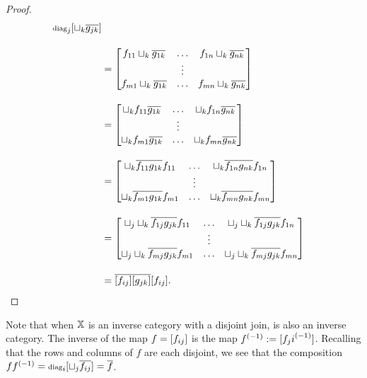 \begin{proof}
\begin{align*}
        [f_{i\jay}]\diag_\jay[\djoin_k \rst{g_{\jay k}}]
        \\[10pt]
      & = \begin{bmatrix}
        f_{11}\djoin_k \rst{g_{1 k}} &\ldots & f_{1n}\djoin_k \rst{g_{n k}} \\
        & \vdots & \\
        f_{m1}\djoin_k \rst{g_{1 k}} &\ldots & f_{m n}\djoin_k \rst{g_{n k}}
      \end{bmatrix}\\[10pt]
      & = \begin{bmatrix}
        \djoin_k f_{11}\rst{g_{1 k}} &\ldots & \djoin_k f_{1n}\rst{g_{n k}} \\
        & \vdots & \\
        \djoin_k f_{m1}\rst{g_{1 k}} &\ldots & \djoin_k f_{m n}\rst{g_{n k}}
      \end{bmatrix}\\[10pt]
      & = \begin{bmatrix}
        \djoin_k \rst{f_{11} g_{1 k}} f_{11} &\ldots & \djoin_k \rst{f_{1n} g_{n k}} f_{1n}\\
        & \vdots & \\
        \djoin_k \rst{f_{m1} g_{1 k}}f_{m1} &\ldots & \djoin_k \rst{f_{m n} g_{n k}}f_{m n}
      \end{bmatrix}\\[10pt]
      & = \begin{bmatrix} %
        \djoin_\jay\djoin_k \rst{f_{1\jay} g_{\jay k}} f_{11} &\ldots &
          \djoin_\jay\djoin_k \rst{f_{1\jay} g_{\jay k}} f_{1n}\\
        & \vdots & \\
        \djoin_\jay\djoin_k \rst{f_{m\jay} g_{\jay k}}f_{m1} &\ldots &
          \djoin_\jay\djoin_k \rst{f_{m \jay} g_{\jay k}}f_{m n}
      \end{bmatrix}\\[10pt]
      &= \rst{[f_{i\jay}][g_{\jay k}]} [f_{i\jay}].
  \end{align*}
\end{proof}

Note that when $\mathbb{X}$ is an inverse category with a disjoint join, \imatx is also an inverse
category. The inverse of the map $f = [f_{ij}]$ is the map ${f}^{(-1)}:=[{f_j i}^{(-1)}]$. Recalling
that the rows and columns of $f$ are each disjoint, we see that the composition
$f {f}^{(-1)} = \operatorname{\scriptstyle{diag}}_i [\sqcup_j \overline{f_{ij}}] = \overline{f}$.

